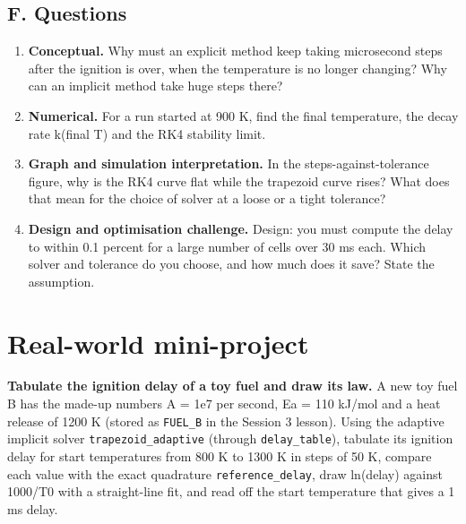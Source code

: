 \documentclass[11pt,a4paper]{article}
\begin{document}
\subsection*{F. Questions}
\begin{enumerate}[nosep]
\item \textbf{Conceptual.} Why must an explicit method keep taking microsecond steps after the ignition is over, when the temperature is no longer changing? Why can an implicit method take huge steps there?
\item \textbf{Numerical.} For a run started at 900 K, find the final temperature, the decay rate k(final T) and the RK4 stability limit.
\item \textbf{Graph and simulation interpretation.} In the steps-against-tolerance figure, why is the RK4 curve flat while the trapezoid curve rises? What does that mean for the choice of solver at a loose or a tight tolerance?
\item \textbf{Design and optimisation challenge.} Design: you must compute the delay to within 0.1 percent for a large number of cells over 30 ms each. Which solver and tolerance do you choose, and how much does it save? State the assumption.
\end{enumerate}

\section{Real-world mini-project}
\textbf{Tabulate the ignition delay of a toy fuel and draw its law.} A new toy fuel B has the made-up numbers A = 1e7 per second, Ea = 110 kJ/mol and a heat release of 1200 K (stored as \texttt{FUEL\_B} in the Session 3 lesson). Using the adaptive implicit solver \texttt{trapezoid\_adaptive} (through \texttt{delay\_table}), tabulate its ignition delay for start temperatures from 800 K to 1300 K in steps of 50 K, compare each value with the exact quadrature \texttt{reference\_delay}, draw ln(delay) against 1000/T0 with a straight-line fit, and read off the start temperature that gives a 1 ms delay.
\end{document}
